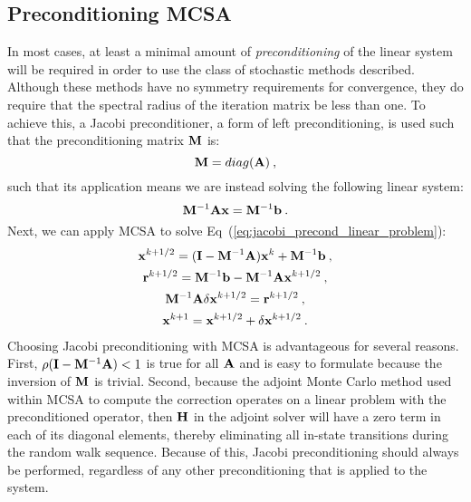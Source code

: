 \subsection{Preconditioning MCSA}
\label{sec:stochastic_preconditioning}
In most cases, at least a minimal amount of \textit{preconditioning}
of the linear system will be required in order to use the class of
stochastic methods described. Although these methods have no symmetry
requirements for convergence, they do require that the spectral radius
of the iteration matrix be less than one. To achieve this, a Jacobi
preconditioner, a form of left preconditioning, is used such that the
preconditioning matrix $\mathbf{M}$ is:
\begin{equation}
  \mathbf{M} = diag(\mathbf{A})\:,
  \label{eq:jacobi_preconditioner}
\end{equation}
such that its application means we are instead solving the following
linear system:
\begin{equation}
  \mathbf{M}^{-1}\mathbf{A}\mathbf{x} = \mathbf{M}^{-1}\mathbf{b}\:.
  \label{eq:jacobi_precond_linear_problem}
\end{equation}
Next, we can apply MCSA to solve
Eq~(\ref{eq:jacobi_precond_linear_problem}): 
\begin{subequations}
  \begin{gather}
    \mathbf{x}^{k+1/2} = (\mathbf{I} - \mathbf{M}^{-1}\mathbf{A})\mathbf{x}^k +
    \mathbf{M}^{-1}\mathbf{b}\:,\\ \mathbf{r}^{k+1/2} = \mathbf{M}^{-1}\mathbf{b} -
    \mathbf{M}^{-1}\mathbf{A}\mathbf{x}^{k+1/2}\:,\\ \mathbf{M}^{-1}\mathbf{A}\delta\mathbf{x}^{k+1/2}
    = \mathbf{r}^{k+1/2}\:,\\ \mathbf{x}^{k+1} = \mathbf{x}^{k+1/2} + \delta
    \mathbf{x}^{k+1/2}\:.
    \label{eq:jacobi_preconditioned_mcsa}
  \end{gather}
\end{subequations}
Choosing Jacobi preconditioning with MCSA is advantageous for several
reasons. First, $\rho(\mathbf{I} - \mathbf{M}^{-1}\mathbf{A}) < 1$ is true for all
$\mathbf{A}$ and is easy to formulate because the inversion of $\mathbf{M}$ is
trivial. Second, because the adjoint Monte Carlo method used within
MCSA to compute the correction operates on a linear problem with the
preconditioned operator, then $\mathbf{H}$ in the adjoint solver will have
a zero term in each of its diagonal elements, thereby eliminating all
in-state transitions during the random walk sequence. Because of this,
Jacobi preconditioning should always be performed, regardless of any
other preconditioning that is applied to the system.

